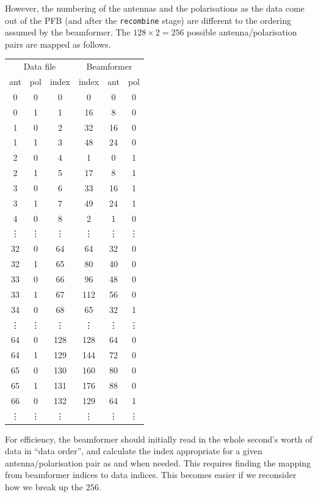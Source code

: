 \documentclass{article}
\begin{document}
However, the numbering of the antennas and the polarisations as the data come out of the PFB (and after the \texttt{recombine} stage) are different to the ordering assumed by the beamformer.
The $128 \times 2 = 256$ possible antenna/polarisation pairs are mapped as follows.
\begin{table}[!h]
    \centering
    \begin{tabular}{ccc|ccc}
        \multicolumn{3}{c}{Data file} & \multicolumn{3}{c}{Beamformer} \\
        ant & pol & index & index & ant & pol \\
        \hline
        0 & 0 & 0 &  0 &  0 & 0 \\
        0 & 1 & 1 & 16 &  8 & 0 \\
        1 & 0 & 2 & 32 & 16 & 0 \\
        1 & 1 & 3 & 48 & 24 & 0 \\
        2 & 0 & 4 &  1 &  0 & 1 \\
        2 & 1 & 5 & 17 &  8 & 1 \\
        3 & 0 & 6 & 33 & 16 & 1 \\
        3 & 1 & 7 & 49 & 24 & 1 \\
        4 & 0 & 8 &  2 &  1 & 0 \\
        \vdots & \vdots & \vdots & \vdots & \vdots & \vdots \\
        32 & 0 & 64 &  64 & 32 & 0 \\
        32 & 1 & 65 &  80 & 40 & 0 \\
        33 & 0 & 66 &  96 & 48 & 0 \\
        33 & 1 & 67 & 112 & 56 & 0 \\
        34 & 0 & 68 &  65 & 32 & 1 \\
        \vdots & \vdots & \vdots & \vdots & \vdots & \vdots \\
        64 & 0 & 128 & 128 & 64 & 0 \\
        64 & 1 & 129 & 144 & 72 & 0 \\
        65 & 0 & 130 & 160 & 80 & 0 \\
        65 & 1 & 131 & 176 & 88 & 0 \\
        66 & 0 & 132 & 129 & 64 & 1 \\
        \vdots & \vdots & \vdots & \vdots & \vdots & \vdots \\
    \end{tabular}
\end{table}

For efficiency, the beamformer should initially read in the whole second's worth of data in ``data order'', and calculate the index appropriate for a given antenna/polarisation pair as and when needed.
This requires finding the mapping from beamformer indices to data indices.
This becomes easier if we reconsider how we break up the $256$.
\end{document}
